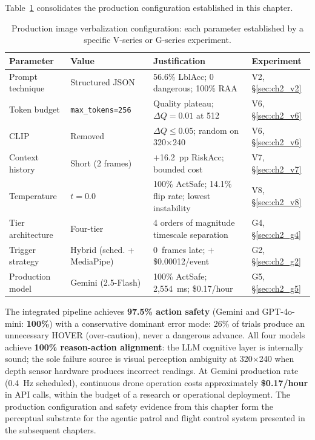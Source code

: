 Table~\ref{tab:ch2_production_config} consolidates the production configuration
established in this chapter.

\begin{table}[ht]
  \caption{Production image verbalization configuration: each parameter
    established by a specific V-series or G-series experiment.}
  \label{tab:ch2_production_config}
  \centering
  \small
  \begin{tabular}{llll}
    \toprule
    Parameter & Value & Justification & Experiment \\
    \midrule
    Prompt technique & Structured JSON & 56.6\% LblAcc; 0 dangerous; 100\% RAA & V2, \S\ref{sec:ch2_v2} \\
    Token budget & \texttt{max\_tokens=256} & Quality plateau; $\Delta Q=0.01$ at 512 & V6, \S\ref{sec:ch2_v6} \\
    CLIP & Removed & $\Delta Q \leq 0.05$; random on 320$\times$240 & V6, \S\ref{sec:ch2_v6} \\
    Context history & Short (2 frames) & $+$16.2~pp RiskAcc; bounded cost & V7, \S\ref{sec:ch2_v7} \\
    Temperature & $t=0.0$ & 100\% ActSafe; 14.1\% flip rate; lowest instability & V8, \S\ref{sec:ch2_v8} \\
    Tier architecture & Four-tier & 4 orders of magnitude timescale separation & G4, \S\ref{sec:ch2_g4} \\
    Trigger strategy & Hybrid (sched. + MediaPipe) & 0~frames late; $+$\$0.00012/event & G2, \S\ref{sec:ch2_g2} \\
    Production model & Gemini (2.5-Flash) & 100\% ActSafe; 2,554~ms; \$0.17/hour & G5, \S\ref{sec:ch2_g5} \\
    \bottomrule
  \end{tabular}
\end{table}

The integrated pipeline achieves \textbf{97.5\% action safety} (Gemini and
GPT-4o-mini: \textbf{100\%}) with a conservative dominant error mode: 26\% of
trials produce an unnecessary HOVER (over-caution), never a dangerous advance.
All four models achieve \textbf{100\% reason-action alignment}: the LLM
cognitive layer is internally sound; the sole failure source is visual
perception ambiguity at 320$\times$240 when depth sensor hardware produces
incorrect readings. At Gemini production rate (0.4~Hz scheduled), continuous
drone operation costs approximately \textbf{\$0.17/hour} in API calls, within
the budget of a research or operational deployment. The production configuration
and safety evidence from this chapter form the perceptual substrate for the
agentic patrol and flight control system presented in the subsequent chapters.
